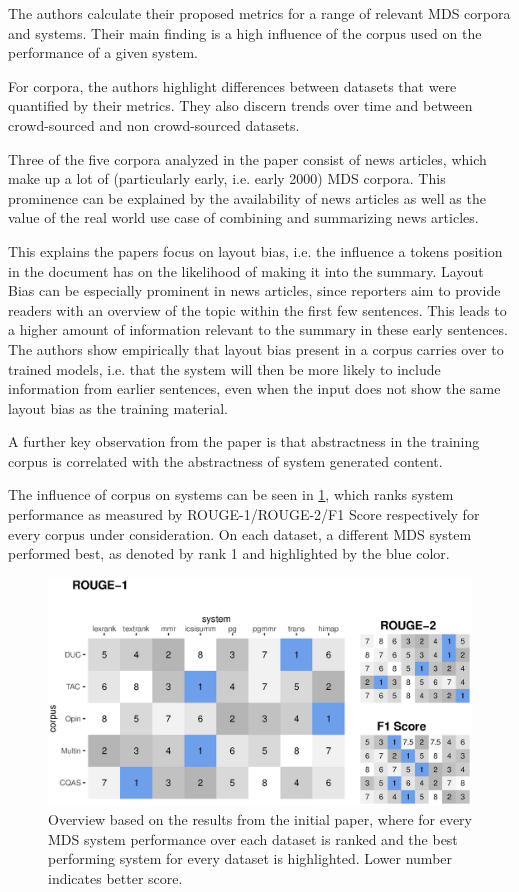 \documentclass[20_original-paper.tex]{subfiles}
\begin{document}
The authors calculate their proposed metrics for a range of relevant MDS corpora and systems.
Their main finding is a high influence of the corpus used on the performance of a given system.

For corpora, the authors highlight differences between datasets that were quantified by their metrics.
They also discern trends over time and between crowd-sourced and non crowd-sourced datasets.

Three of the five corpora analyzed in the paper consist of news articles,  which make up a lot of (particularly early, i.e. early 2000) MDS corpora.
This prominence can be explained by the availability of news articles as well as the value of the real world use case of combining and summarizing news articles.

This explains the papers focus on layout bias, i.e. the influence a tokens position in the document has on the likelihood of making it into the summary.
Layout Bias can be especially prominent in news articles, since reporters aim to provide readers with an overview of the topic within the first few sentences.
This leads to a higher amount of  information relevant to the summary in these early sentences.
The authors show empirically that layout bias present in a corpus carries over to trained models, i.e. that the system will then be more likely to include information from earlier sentences,
even when the input does not show the same layout bias as the training material.\cite{dey-etal-2020-corpora}

A further key observation from the paper is that abstractness in the training corpus is correlated with the abstractness of system generated content.

The influence of corpus on systems can be seen in \ref{results}, which ranks system performance as measured by ROUGE-1/ROUGE-2/F1 Score respectively for every corpus under consideration.
On each dataset, a different MDS system performed best, as denoted by rank 1 and highlighted by the blue color.


\begin{figure}
    \includegraphics[width=\textwidth]{figures/results.eps}
    \caption{Overview based on the results from the initial paper, where for every MDS system performance over each dataset is ranked and the best performing system for every dataset is highlighted. Lower number indicates better score.} \label{results}
\end{figure}
\end{document}
